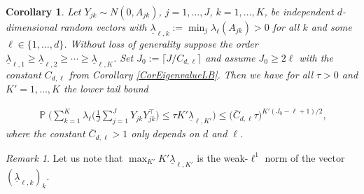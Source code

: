 \documentclass[preprint,aos]{imsart}
\numberwithin{equation}{section}
\newtheorem{corollary}[satz]{Corollary}
\theoremstyle{remark}
\newtheorem{remark}[satz]{Remark}
\DeclareMathOperator{\PP}{{\mathbb P}}
\providecommand{\ceil}[1]{\lceil #1 \rceil}
\renewcommand{\le}{\leqslant}
\renewcommand{\ge}{\geqslant}
\begin{document}
\begin{appendix}
\begin{corollary}\label{CorEigenvalueTriangular}
Let $Y_{jk}\sim N(0,A_{jk})$, $j=1,\ldots,J$, $k=1,\ldots,K$, be independent $d$-dimensional random vectors  with $\underline\lambda_{\ell,k}:=\min_j\lambda_\ell(A_{jk})>0$ for all $k$ and some $\ell\in\{1,\ldots,d\}$. Without loss of generality suppose the order $\underline\lambda_{\ell,1}\ge \underline\lambda_{\ell,2}\ge\cdots\ge\underline\lambda_{\ell,K}$. Set $J_0:=\ceil{J/C_{d,\ell}}$ and assume $J_0\ge 2\ell$ with the constant $C_{d,\ell}$ from Corollary \ref{CorEigenvalueLB}. Then  we have for all $\tau>0$ and $K'=1,\ldots,K$ the lower tail bound
\begin{comment}
\begin{align*}
\PP\Big(\sum_{k=1}^K \lambda_\ell\Big(\frac1{J}\sum_{j=1}^JY_{jk}Y_{jk}^\top\Big)\le t\Big)\le \min_{1\le K'\le K} %
\Big(\frac{eC_{J_0,\ell}d^{1/2}J_0}{J_0-\ell+1} t \prod_{k=1}^{K'}(K'\underline\lambda_{\ell,k})^{-1/K'}\Big)^{K'(J_0-\ell+1)/2}
,
\end{align*}
where $C_{J_0,\ell}:=(\frac{ \Gamma(1/2)\Gamma((J_0+1)/2)} {\Gamma(\ell/2)\Gamma((J_0-\ell+2)/2)})^{2/(J_0-\ell+1)}$. In particular, for any $K'=1,\ldots,K$ and $\tau>0$ we have
\end{comment}
\begin{align*}
\PP\Big(\sum_{k=1}^K \lambda_\ell\Big(\frac1{J}\sum_{j=1}^JY_{jk}Y_{jk}^\top\Big)\le \tau K'\underline\lambda_{\ell,K'}\Big)\le %
\Big(\bar C_{d,\ell} \tau\Big)^{K'(J_0-\ell+1)/2},
\end{align*}
where the constant $\bar C_{d,\ell}>1$ only depends on $d$ and $\ell$.
\end{corollary}

\begin{remark}
Let us note that $\max_{K'}K'\underline\lambda_{\ell,K'}$ is the weak-$\ell^1$ norm of the vector $(\underline\lambda_{\ell,k})_k$.
\end{remark}


\end{appendix}
\end{document}

